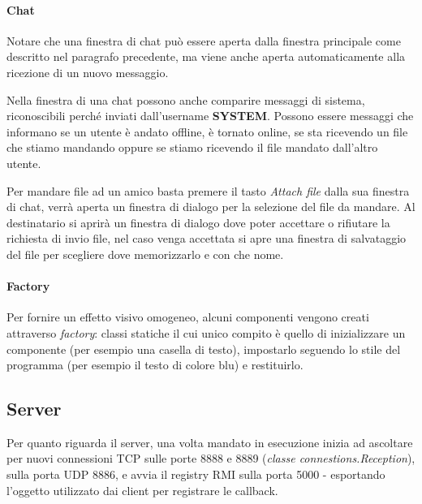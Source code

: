 \paragraph{Chat}
Notare che una finestra di chat può essere aperta dalla finestra principale come descritto nel paragrafo precedente, ma viene anche aperta automaticamente alla ricezione di un nuovo messaggio.

Nella finestra di una chat possono anche comparire messaggi di sistema, riconoscibili perché inviati dall'username \textbf{SYSTEM}. Possono essere messaggi che informano se un utente è andato offline, è tornato online, se sta ricevendo un file che stiamo mandando oppure se stiamo ricevendo il file mandato dall'altro utente.

Per mandare file ad un amico basta premere il tasto \textit{Attach file} dalla sua finestra di chat, verrà aperta un finestra di dialogo per la selezione del file da mandare. Al destinatario si aprirà un finestra di dialogo dove poter accettare o rifiutare la richiesta di invio file, nel caso venga accettata si apre una finestra di salvataggio del file per scegliere dove memorizzarlo e con che nome.

\begin{figure}[h]
    \centering
    \qquad
\end{figure}

\paragraph{Factory}
Per fornire un effetto visivo omogeneo, alcuni componenti vengono creati attraverso \textit{factory}: classi statiche il cui unico compito è quello di inizializzare un componente (per esempio una casella di testo), impostarlo seguendo lo stile del programma (per esempio il testo di colore blu) e restituirlo.

\subsection{Server}

Per quanto riguarda il server, una volta mandato in esecuzione inizia ad ascoltare per nuovi connessioni TCP sulle porte 8888 e 8889 (\textit{classe connestions.Reception}), sulla porta UDP 8886, e avvia il registry RMI sulla porta 5000 - esportando l'oggetto utilizzato dai client per registrare le callback.

